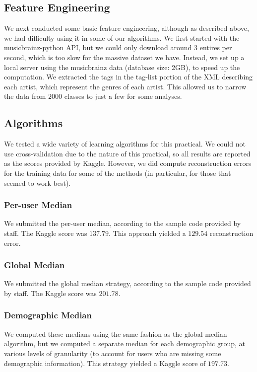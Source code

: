 \documentclass[10pt]{article}
\begin{document}
\subsection{Feature Engineering}
We next conducted some basic feature engineering, although as described above, we had difficulty using it in some of our algorithms. We first started with the musicbrainz-python API, but we could only download around $3$ entires per second, which is too slow for the massive dataset we have. Instead, we set up a local server using the musicbrainz data (database size: 2GB), to speed up the computation. We extracted the tags in the tag-list portion of the XML describing each artist, which represent the genres of each artist. This allowed us to narrow the data from $2000$ classes to just a few for some analyses.

\subsection{Algorithms}
We tested a wide variety of learning algorithms for this practical. We could not use cross-validation due to the nature of this practical, so all results are reported as the scores provided by Kaggle. However, we did compute reconstruction errors for the training data for some of the methods (in particular, for those that seemed to work best).

\subsubsection{Per-user Median}
We submitted the per-user median, according to the sample code provided by staff. The Kaggle score was $137.79$. This approach yielded a $129.54$ reconstruction error.

\subsubsection{Global Median}
We submitted the global median strategy, according to the sample code provided by staff. The Kaggle score was $201.78$.

\subsubsection{Demographic Median}
We computed these medians using the same fashion as the global median algorithm, but we computed a separate median for each demographic group, at various levels of granularity (to account for users who are missing some demographic information). This strategy yielded a Kaggle score of $197.73$.
\end{document}
